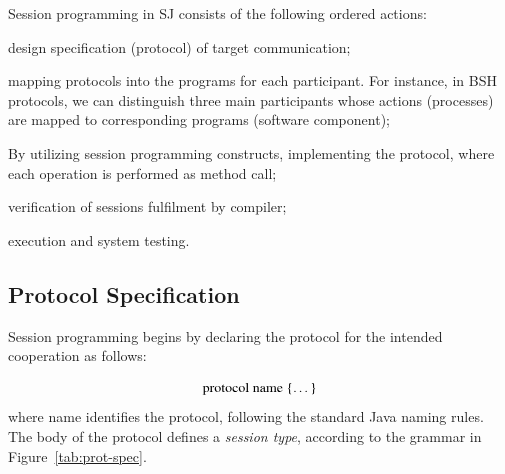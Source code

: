 \documentclass{llncs}
\begin{document}
Session programming in SJ consists of the following ordered actions:

\begin{compactenum}
  \item design specification (protocol) of target communication;
  \item mapping protocols into the programs for each participant. For instance, in BSH protocols, we can distinguish three main participants whose actions (processes) are mapped to corresponding programs (software component);
  \item By utilizing session programming constructs, implementing the protocol, where each operation is performed as method call;
  \item verification of sessions fulfilment by  compiler;
  \item execution and system testing.
\end{compactenum}

\subsection{Protocol Specification}
Session programming begins by declaring the protocol for the intended cooperation as follows:

\begin{equation*}
\text{protocol name \{\dots\}}
\end{equation*}
where name identifies the protocol, following the standard Java naming rules. The body of the protocol defines a \textit{session type}, according to the grammar in Figure~\ref{tab:prot-spec}.

\end{document}
